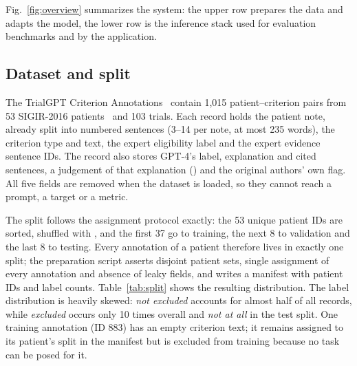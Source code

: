 Fig.~\ref{fig:overview} summarizes the system: the upper row prepares the data and adapts the model,
the lower row is the inference stack used for evaluation benchmarks and by the application.

\subsection{Dataset and split}
\label{sec:data}
The TrialGPT Criterion Annotations~\cite{jin2024trialgpt} contain 1,015 patient--criterion pairs
from 53 SIGIR-2016 patients~\cite{koopman2016test} and 103 trials. Each record holds the patient
note, already split into numbered sentences (3--14 per note, at most 235 words), the criterion type
and text, the expert eligibility label and the expert evidence sentence IDs. The record also stores
GPT-4's label, explanation and cited sentences, a judgement of that explanation
() and the original authors' own  flag. All five fields
are removed when the dataset is loaded, so they cannot reach a prompt, a target or a metric.

The split follows the assignment protocol exactly: the 53 unique patient IDs are sorted,
shuffled with , and the first 37 go to training, the next 8 to
validation and the last 8 to testing. Every annotation of a patient therefore lives in exactly one
split; the preparation script asserts disjoint patient sets, single assignment of every annotation
and absence of leaky fields, and writes a manifest with patient IDs and label counts.
Table~\ref{tab:split} shows the resulting distribution. The label distribution is heavily skewed:
\emph{not excluded} accounts for almost half of all records, while \emph{excluded} occurs only 10
times overall and \emph{not at all} in the test split. One training annotation (ID 883) has an empty
criterion text; it remains assigned to its patient's split in the manifest but is excluded from
training because no task can be posed for it.

